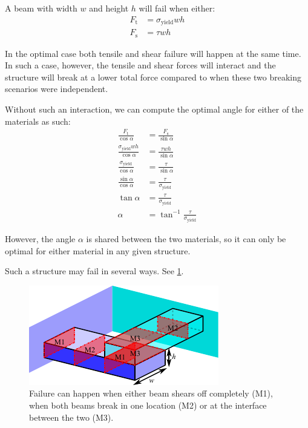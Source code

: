 A beam with width $w$ and height $h$ will fail when either:
\begin{align}
	F_\text{t} &= \sigma_\text{yield} w h \\
	F_\text{s} &= \tau w h 
\end{align}

In the optimal case both tensile and shear failure will happen at the same time.
In such a case, however, the tensile and shear forces will interact and the structure will break at a lower total force compared to when these two breaking scenarios were independent.

Without such an interaction, we can compute the optimal angle for either of the materials as such:
\begin{align}
	\frac{F_\text{t}}{\cos \alpha} &= \frac{F_\text{s}}{\sin \alpha} \\
	\frac{\sigma_\text{yield} w h}{\cos \alpha} &= \frac{\tau w h}{\sin \alpha} \\
	\frac{\sigma_\text{yield}}{\cos \alpha} &= \frac{\tau}{\sin \alpha} \\
	\frac{\sin \alpha}{\cos \alpha} &= \frac{\tau}{\sigma_\text{yield}} \\
	\tan \alpha &= \frac{\tau}{\sigma_\text{yield}} \\
	\alpha &= \tan^{-1} \frac{\tau}{\sigma_\text{yield}}
\end{align}

However, the angle $\alpha$ is shared between the two materials, so it can only be optimal for either material in any given structure.





Such a structure may fail in several ways.
See \cref{fig:failure_modes_diagonal}.

\begin{figure}
	\centering
	\includegraphics[width=.75\columnwidth]{../sources/method/failure_modes_diagonal.pdf}
	\caption{Failure can happen when either beam shears off completely (M1), when both beams break in one location (M2) or at the interface between the two (M3).}
	\label{fig:failure_modes_diagonal}
\end{figure}









